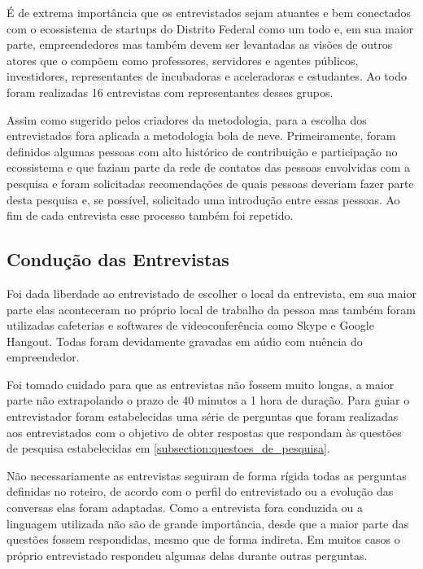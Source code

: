 É de extrema importância que os entrevistados sejam atuantes e bem conectados com o ecossistema de startups do Distrito Federal como um todo e, em sua maior parte, empreendedores mas também devem ser levantadas as visões de outros atores que o compõem como professores, servidores e agentes públicos, investidores, representantes de incubadoras e aceleradoras e estudantes. Ao todo foram realizadas 16 entrevistas com representantes desses grupos.

Assim como sugerido pelos criadores da metodologia, para a escolha dos entrevistados fora aplicada a metodologia bola de neve. Primeiramente, foram definidos algumas pessoas com alto histórico de contribuição e participação no ecossistema e que faziam parte da rede de contatos das pessoas envolvidas com a pesquisa e foram solicitadas recomendações de quais pessoas deveriam fazer parte desta pesquisa e, se possível, solicitado uma introdução entre essas pessoas. Ao fim de cada entrevista esse processo também foi repetido.

\subsection{Condução das Entrevistas}
\label{subsection:conducao_das_entrevistas}

Foi dada liberdade ao entrevistado de escolher o local da entrevista, em sua maior parte elas aconteceram no próprio local de trabalho da pessoa mas também foram utilizadas cafeterias e softwares de videoconferência como Skype e Google Hangout. Todas foram devidamente gravadas em aúdio com nuência do empreendedor.

Foi tomado cuidado para que as entrevistas não fossem muito longas, a maior parte não extrapolando o prazo de 40 minutos a 1 hora de duração. Para guiar o entrevistador foram estabelecidas uma série de perguntas que foram realizadas aos entrevistados com o objetivo de obter respostas que respondam às questões de pesquisa estabelecidas em \ref{subsection:questoes_de_pesquisa}.

Não necessariamente as entrevistas seguiram de forma rígida todas as perguntas definidas no roteiro, de acordo com o perfil do entrevistado ou a evolução das conversas elas foram adaptadas. Como a entrevista fora conduzida ou a linguagem utilizada não são de grande importância, desde que a maior parte das questões fossem respondidas, mesmo que de forma indireta. Em muitos casos o próprio entrevistado respondeu algumas delas durante outras perguntas. 

